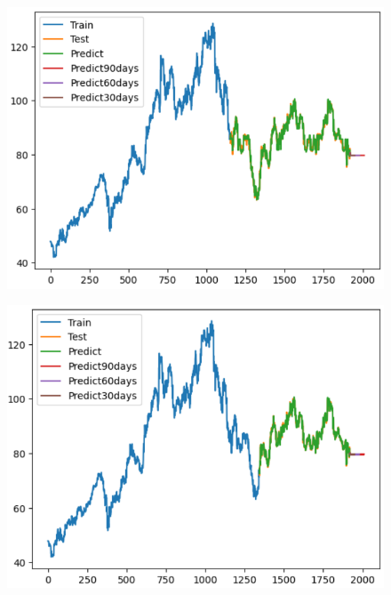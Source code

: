 \documentclass[conference]{IEEEtran}
\begin{document}
\begin{figure}[H]
    \centering
    \begin{minipage}{0.15\textwidth}
    \centering
    \includegraphics[width=1\textwidth]{Image/XGBoost/XGBoost_SONY_6_4.png}
   
    \label{fig:1}
    \end{minipage}%
    \begin{minipage}{0.15\textwidth}
    \centering
    \includegraphics[width=1\textwidth]{Image/XGBoost/XGBoost_SONY_7_3.png}
  

\end{minipage}
\end{figure}
\end{document}
